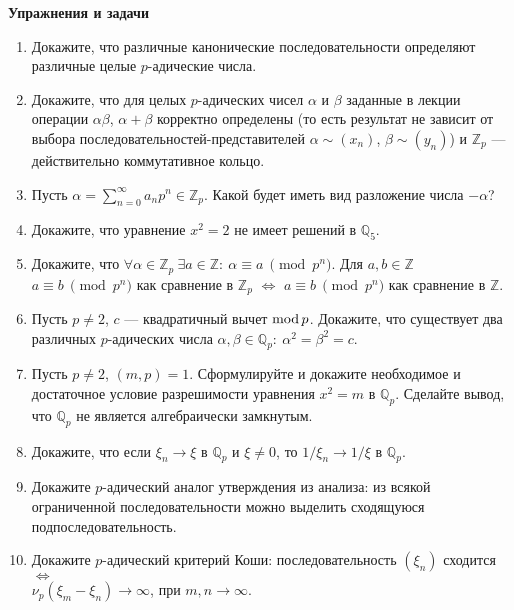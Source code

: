 \noindent\textbf{Упражнения и задачи}

\begin{enumerate}[topsep=0pt]

    \item Докажите, что различные канонические последовательности определяют различные целые $p$-адические числа. %

    \item Докажите, что для целых $p$-адических чисел $\alpha$ и $\beta$ заданные в лекции операции $\alpha \beta$, $\alpha + \beta$ корректно определены (то есть результат не зависит от выбора последовательностей-представителей $\alpha \sim (x_n)$, $\beta \sim (y_n)$) и $\mathbb{Z}_p$ --- действительно коммутативное кольцо. %

    \item Пусть $\alpha = \sum_{n=0}^{\infty} a_n p^n \in \mathbb{Z}_p$. Какой будет иметь вид разложение числа $-\alpha$? %

    \item Докажите, что уравнение $x^2=2$ не имеет решений в $\mathbb{Q}_5$.

    \item Докажите, что $\forall \alpha \in \mathbb{Z}_p\ \exists a \in \mathbb{Z}:\ \alpha \equiv a\ \pmod{p^n}$. Для $a, b \in \mathbb{Z}$ $a \equiv b\ \pmod{p^n}$ как сравнение в $\mathbb{Z}_p$ $\Leftrightarrow$ $a \equiv b\ \pmod{p^n}$ как сравнение в $\mathbb{Z}$. %

    \item Пусть $p\neq 2$, $c$ --- квадратичный вычет $\operatorname{mod} p$. Докажите, что существует два различных $p$-адических числа $\alpha, \beta \in \mathbb{Q}_p:\ \alpha^2 = \beta^2 = c$. %

    \item Пусть $p\neq 2$, $(m,p)=1$. Сформулируйте и докажите необходимое и достаточное условие разрешимости уравнения $x^2=m$ в $\mathbb{Q}_p$. Сделайте вывод, что $\mathbb{Q}_p$ не является алгебраически замкнутым.

    \item Докажите, что если $\xi_n \rightarrow \xi$ в $\mathbb{Q}_p$ и $\xi\neq 0$, то $1 / \xi_n \rightarrow 1/\xi$ в $\mathbb{Q}_p$. %

    \item Докажите $p$-адический аналог утверждения из анализа: из всякой ограниченной последовательности можно выделить сходящуюся подпоследовательность. %

    \item Докажите $p$-адический критерий Коши: последовательность $(\xi_n)$ сходится $\Leftrightarrow$\\ ${\nu_p(\xi_m-\xi_n) \rightarrow \infty}$, при $m,n \rightarrow \infty$. %


\end{enumerate}
